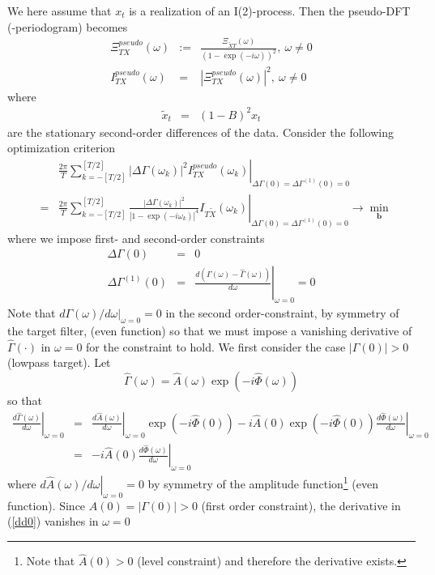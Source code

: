 \documentclass[a4paper]{book}
\begin{document}
We here assume that $x_t$ is a realization of an I(2)-process. Then the pseudo-DFT (-periodogram) becomes
\begin{eqnarray}
\Xi_{TX}^{pseudo}(\omega)&:=&\frac{\Xi_{\tilde{X}T}(\omega)}{(1-\exp(-i\omega))^2},~\omega\neq 0\nonumber\\
I_{TX}^{pseudo}(\omega)&=&\left|\Xi_{TX}^{pseudo}(\omega)\right|^2,~\omega\neq 0\label{pseudo_per_i2}
\end{eqnarray}
where 
\begin{eqnarray*}
\tilde{x}_t&=&(1-B)^2x_t
\end{eqnarray*}
are the stationary second-order differences of the data. Consider the following optimization criterion 
\begin{eqnarray}
&&\left.\frac{2\pi}{T}\sum_{k=-[T/2]}^{[T/2]}\left|\Delta\Gamma(\omega_k) \right|^2I_{TX}^{pseudo}(\omega_k)\right|_{\Delta\Gamma(0)=\Delta\Gamma^{(1)}(0)=0}\nonumber \\
&=&\left.\frac{2\pi}{T}\sum_{k=-[T/2]}^{[T/2]}\frac{\left|\Delta\Gamma(\omega_k) \right|^2}{|1-\exp(-i\omega_k)|^4}I_{T\tilde{X}}(\omega_k)\right|_{\Delta\Gamma(0)=\Delta\Gamma^{(1)}(0)=0}\to\min_{\mathbf{b}}\label{sos_rhs}
\end{eqnarray}
where we impose first- and second-order constraints
\begin{eqnarray*}
\Delta\Gamma(0)&=&0\\
\Delta\Gamma^{(1)}(0)&=&\left.\frac{d (\Gamma(\omega)-\hat{\Gamma}(\omega))}{d\omega}\right|_{\omega=0}=0
\end{eqnarray*}
Note that \(\left.d
\Gamma(\omega)/d\omega\right|_{\omega=0}=0\) in the second order-constraint, by symmetry of the target filter, (even function) so that we must impose a vanishing derivative of $\hat{\Gamma}(\cdot)$ in $\omega=0$ for the constraint to hold. We first consider the case $ |\Gamma(0)|>0$ (lowpass target). Let
\[\hat{\Gamma}(\omega)=\hat{A}(\omega)\exp(-i\hat{\Phi}(\omega))\]
so that
\begin{eqnarray}\label{dd0}
\left.\frac{d\hat{\Gamma}(\omega)}{d\omega}\right|_{\omega=0}&=&
\left.\frac{d\hat{A}(\omega)}{d\omega}\right|_{\omega=0}\exp(-i\hat{\Phi}(0))-
i\hat{A}(0)\exp(-i\hat{\Phi}(0))\left.\frac{d\hat{\Phi}(\omega)}{d\omega}\right|_{\omega=0}\label{dd0_dodo}\\
&=&-i\hat{A}(0)\left.\frac{d\hat{\Phi}(\omega)}{d\omega}\right|_{\omega=0}\label{dd0}
\end{eqnarray}
where \(\left.d\hat{A}(\omega)/d\omega\right|_{\omega=0}=0\)
by symmetry of the amplitude function\footnote{Note that $\hat{A}(0)>0$ (level constraint) and therefore the derivative exists.} (even function). Since  \(\hat{A}(0)=|\Gamma(0)|>0\) (first order constraint), the derivative in (\ref{dd0}) vanishes in \(\omega=0\)
\end{document}
